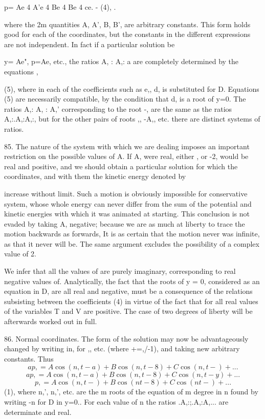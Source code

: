 p= Ae 4 A'e 4 Be 4 Be 4 ce. - (4), .

where the 2m quantities A, A', B, B', are arbitrary constants. This form holds
good for each of the coordinates, but the constants in the different
expressions are not independent. In fact if a particular solution be

y= Ae", p=Ae, etc., the ratios A, : A,: a are completely determined by the
equations ,

(5), where in each of the coefficients such as e,, d, is substituted for D.
Equations (5) are necessarily compatible, by the condition that d, is a root of
y=0. The ratios A,: A, : A,' corresponding to the root -, are the same as the
ratios A,:.A,:A,:, but for the other pairs of roots ,, -A,, etc. there are
distinct systems of ratios.

85. The nature of the system with which we are dealing imposes an important
restriction on the possible values of A. If A, were real, either , or -2, would
be real and positive, and we should obtain a particular solution for which the
coordinates, and with them the kinetic energy denoted by

increase without limit. Such a motion is obviously impossible for conservative
system, whose whole energy can never differ from the sum of the potential and
kinetic energies with which it was animated at starting. This conclusion is not
evaded by taking A, negative; because we are as much at liberty to trace the
motion backwards as forwards, It is as certain that the motion never was
infinite, as that it never will be. The same argument excludes the possibility
of a complex value of 2.

We infer that all the values of are purely imaginary, corresponding to real
negative values of. Analytically, the fact that the roots of y = 0, considered
as an equation in D, are all real and negative, must be a consequence of the
relations subsisting between the coefficients (4) in virtue of the fact that
for all real values of the variables T and V are positive. The case of two
degrees of liberty will be afterwards worked out in full.

86.  Normal coordinates.  The form of the solution may now be advantageously
changed by writing in, for
,, etc. (where +=,/-1), and taking new arbitrary constants. Thus
\[ap, = A \cos(n,t-a) + B \cos(n,t- 8) + C \cos(n,t -) +...\]
\[ap, = A \cos(n,t - a) + B \cos(n,t - 8) + C \cos(n,t -y) +...\]
\[p, = A \cos(n,t-) + B \cos(nt - 8) + C \cos(nt -) +...\]
 (1), where n,', n,', etc. are the m roots of the equation of
m degree in n found by writing -n for D in y=0.. For each value of n the ratios
.A,:;.A,:A,... are determinate and real.

